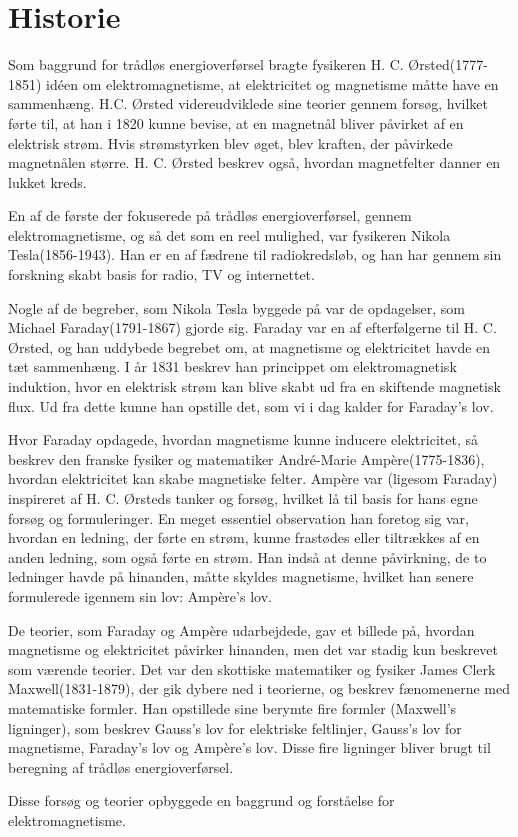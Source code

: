 \section{Historie}

Som baggrund for trådløs energioverførsel bragte fysikeren H. C. Ørsted(1777-1851) idéen om elektromagnetisme, at elektricitet og magnetisme måtte have en sammenhæng. H.C. Ørsted videreudviklede sine teorier gennem forsøg, hvilket førte til, at han i 1820 kunne bevise, at en magnetnål bliver påvirket af en elektrisk strøm. Hvis strømstyrken blev øget, blev kraften, der påvirkede magnetnålen større. H. C. Ørsted beskrev også, hvordan magnetfelter danner en lukket kreds.

En af de første der fokuserede på trådløs energioverførsel, gennem elektromagnetisme, og så det som en reel mulighed, var fysikeren Nikola Tesla(1856-1943). Han er en af fædrene til radiokredsløb, og han har gennem sin forskning skabt basis for radio, TV og internettet.

Nogle af de begreber, som Nikola Tesla byggede på var de opdagelser, som Michael Faraday(1791-1867) gjorde sig. Faraday var en af efterfølgerne til H. C. Ørsted, og han uddybede begrebet om, at magnetisme og elektricitet havde en tæt sammenhæng. I år 1831 beskrev han princippet om elektromagnetisk induktion, hvor en elektrisk strøm kan blive skabt ud fra en skiftende magnetisk flux. Ud fra dette kunne han opstille det, som vi i dag kalder for Faraday's lov.

Hvor Faraday opdagede, hvordan magnetisme kunne inducere elektricitet, så beskrev den franske fysiker og matematiker André-Marie Ampère(1775-1836), hvordan elektricitet kan skabe magnetiske felter. Ampère var (ligesom Faraday) inspireret af H. C. Ørsteds tanker og forsøg, hvilket lå til basis for hans egne forsøg og formuleringer. En meget essentiel observation han foretog sig var, hvordan en ledning, der førte en strøm, kunne frastødes eller tiltrækkes af en anden ledning, som også førte en strøm. Han indså at denne påvirkning, de to ledninger havde på hinanden, måtte skyldes magnetisme, hvilket han senere formulerede igennem sin lov: Ampère's lov.

De teorier, som Faraday og Ampère udarbejdede, gav et billede på, hvordan magnetisme og elektricitet påvirker hinanden, men det var stadig kun beskrevet som værende teorier. Det var den skottiske matematiker og fysiker James Clerk Maxwell(1831-1879), der gik dybere ned i teorierne, og beskrev fænomenerne med matematiske formler. Han opstillede sine berymte fire formler (Maxwell's ligninger), som beskrev Gauss's lov for elektriske feltlinjer, Gauss's lov for magnetisme, Faraday's lov og Ampère's lov. Disse fire ligninger bliver brugt til beregning af trådløs energioverførsel.

Disse forsøg og teorier opbyggede en baggrund og forståelse for elektromagnetisme.  
\newpage